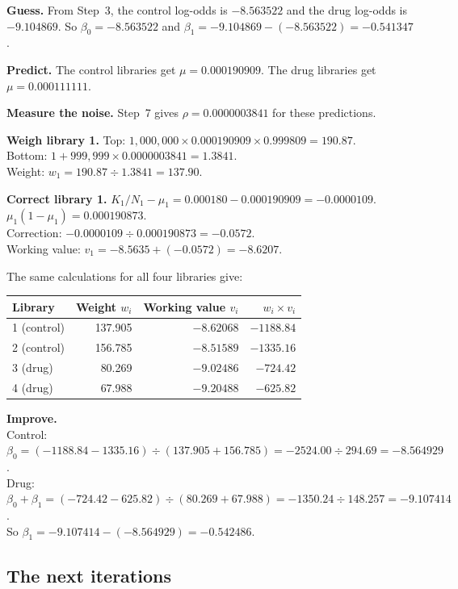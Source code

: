 \documentclass[12pt]{article}
\begin{document}
\begin{worked}[ 10: iteration 1]
\textbf{Guess.} From Step~3, the control log-odds is $-8.563522$ and the
drug log-odds is $-9.104869$. So $\beta_0 = -8.563522$ and
$\beta_1 = -9.104869 - (-8.563522) = -0.541347$.

\textbf{Predict.} The control libraries get $\mu = 0.000190909$. The drug
libraries get $\mu = 0.000111111$.

\textbf{Measure the noise.} Step~7 gives $\rho = 0.0000003841$ for these
predictions.

\textbf{Weigh library 1.}
Top: $1{,}000{,}000 \times 0.000190909 \times 0.999809 = 190.87$.\\
Bottom: $1 + 999{,}999 \times 0.0000003841 = 1.3841$.\\
Weight: $w_1 = 190.87 \div 1.3841 = 137.90$.

\textbf{Correct library 1.}
$K_1/N_1 - \mu_1 = 0.000180 - 0.000190909 = -0.0000109$.\\
$\mu_1(1-\mu_1) = 0.000190873$.\\
Correction: $-0.0000109 \div 0.000190873 = -0.0572$.\\
Working value: $v_1 = -8.5635 + (-0.0572) = -8.6207$.

The same calculations for all four libraries give:

\begin{tabular}{@{}lrrr@{}}
\toprule
Library & Weight $w_i$ & Working value $v_i$ & $w_i \times v_i$\\
\midrule
1 (control) & 137.905 & $-8.62068$ & $-1188.84$\\
2 (control) & 156.785 & $-8.51589$ & $-1335.16$\\
3 (drug)    &  80.269 & $-9.02486$ &  $-724.42$\\
4 (drug)    &  67.988 & $-9.20488$ &  $-625.82$\\
\bottomrule
\end{tabular}

\textbf{Improve.}\\
Control: $\beta_0 = (-1188.84 - 1335.16) \div (137.905 + 156.785)
 = -2524.00 \div 294.69 = -8.564929$.\\
Drug: $\beta_0 + \beta_1 = (-724.42 - 625.82) \div (80.269 + 67.988)
 = -1350.24 \div 148.257 = -9.107414$.\\
So $\beta_1 = -9.107414 - (-8.564929) = -0.542486$.
\end{worked}

\subsection{The next iterations}
\end{document}
